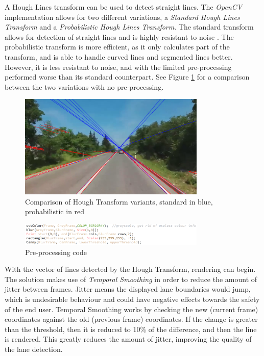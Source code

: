 \documentclass[conference]{IEEEtran}
\begin{document}
A Hough Lines transform can be used to detect straight lines. The \textit{OpenCV} implementation allows for two different variations, a \textit{Standard Hough Lines Transform} and a \textit{Probabilistic Hough Lines Transform}. The standard transform allows for detection of straight lines and is highly resistant to noise \cite{4608701}. The probabilistic transform is more efficient, as it only calculates part of the transform, and is able to handle curved lines and segmented lines better. However, it is less resistant to noise, and with the limited pre-processing performed worse than its standard counterpart. See Figure \ref{fig:houghComp} for a comparison between the two variations with no pre-processing. 
\begin{figure}[H]
\centering
\includegraphics[width=3.5in]{t5_houghcomp}
\caption{Comparison of Hough Transform variants, standard in blue, probabilistic in red}
\label{fig:houghComp}
\end{figure}
\begin{figure}[H]
\centering
\includegraphics[width=3.5in]{t5_proc}
\caption{Pre-processing code}
\label{fig:t5proc}
\end{figure}
With the vector of lines detected by the Hough Transform, rendering can begin. The solution makes use of \textit{Temporal Smoothing}\cite{TemporalSmoothing} in order to reduce the amount of jitter between frames. Jitter means the displayed lane boundaries would jump, which is undesirable behaviour and could have negative effects towards the safety of the end user. Temporal Smoothing works by checking the new (current frame) coordinates against the old (previous frame) coordinates. If the change is greater than the threshold, then it is reduced to 10\% of the difference, and then the line is rendered. This greatly reduces the amount of jitter, improving the quality of the lane detection. 
\end{document}
